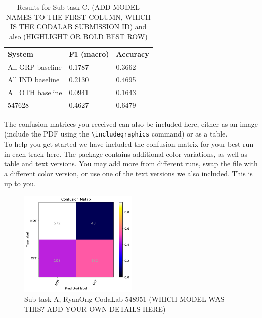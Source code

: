 \documentclass[11pt,a4paper]{article}
\begin{document}
\begin{table}[h]
\center
\begin{tabular}{|lll|}
\hline
\bf System & \bf F1 (macro) & \bf Accuracy \\ 
\hline
All GRP baseline & 0.1787 & 0.3662 \\
All IND baseline & 0.2130 & 0.4695 \\
All OTH baseline & 0.0941 & 0.1643 \\
\hline
547628 & 0.4627 & 0.6479 \\
\hline
\end{tabular}
\caption{Results for Sub-task C. (ADD MODEL NAMES TO THE FIRST COLUMN, WHICH IS THE CODALAB SUBMISSION ID) and also (HIGHLIGHT OR BOLD BEST ROW)}
\label{tab:results-C-open}
\end{table}



\clearpage %


The confusion matrices you received can also be included here, either as an image (include the PDF using the  \verb|\includegraphics| command) or as a table.\\

To help you get started we have included the confusion matrix for your best run in each track here. The package contains additional color variations, as well as table and text versions. You may add more from different runs, swap the file with a different color version, or use one of the text versions we also included. This is up to you.


\begin{figure}
\centering
\includegraphics[width=0.5\textwidth]{Sub-task_A,_RyanOng_CodaLab_548951.pdf}
\caption{Sub-task A, RyanOng CodaLab 548951 (WHICH MODEL WAS THIS? ADD YOUR OWN DETAILS HERE)}
\label{fig:1}
\end{figure}
\end{document}

